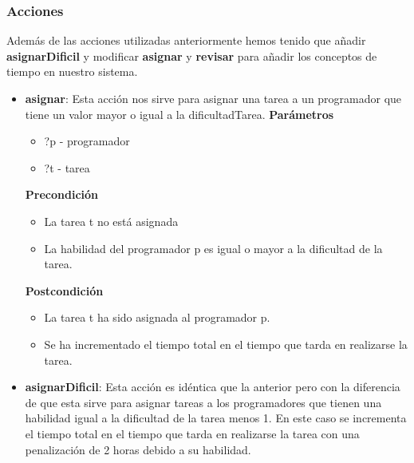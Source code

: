 \documentclass[11pt]{article}
\begin{document}
\subsubsection{Acciones}
Además de las acciones utilizadas anteriormente hemos tenido que añadir \textbf{asignarDificil} y modificar \textbf{asignar} y \textbf{revisar} para añadir los conceptos de tiempo en nuestro sistema.
\begin{itemize}
	\item \textbf{asignar}: Esta acción nos sirve para asignar una tarea a un programador que tiene un valor mayor o igual a la dificultadTarea. 
	\textbf{Parámetros}
	\begin{itemize}
		\item ?p - programador
		\item ?t - tarea
	\end{itemize}
	\textbf{Precondición}
	\begin{itemize}
		\item La tarea t no está asignada
		\item La habilidad del programador p es igual o mayor a la dificultad de la tarea. 
	\end{itemize}
	\textbf{Postcondición}
	\begin{itemize}	
		\item La tarea t ha sido asignada al programador p.
		\item Se ha incrementado el tiempo total en  el tiempo que tarda en realizarse la tarea.
	\end{itemize}

	\item \textbf{asignarDificil}: Esta acción es idéntica que la anterior pero con la diferencia de que esta sirve para asignar tareas a los programadores que tienen una habilidad igual a la dificultad de la tarea menos 1. En este caso se incrementa el tiempo total en el tiempo que tarda en realizarse la tarea con una penalización de 2 horas debido a su habilidad.


\end{itemize}
\end{document}
